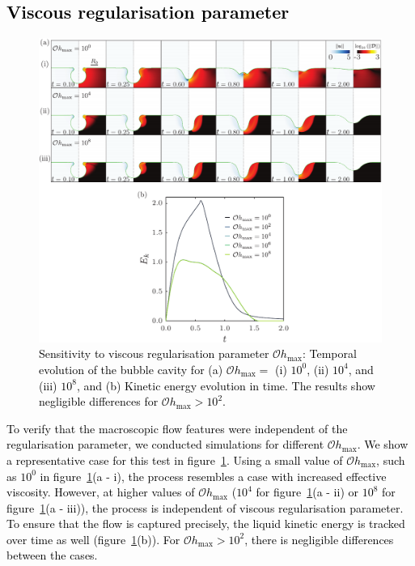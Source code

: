 \documentclass[final]{jfm}
\newcommand*\red{\textcolor{black}}
\begin{document}
\subsection{\red{Viscous regularisation parameter}}\label{App::OhMax}
\begin{figure}
	\centerline{\includegraphics[width=\linewidth]{FigureE1-eps-converted-to.pdf}}%
	\caption{\red{Sensitivity to viscous regularisation parameter $\mathcal{O}h_{\text{max}}$: Temporal evolution of the bubble cavity for (a) $\mathcal{O}h_{\text{max}} =$ (i) $10^0$, (ii) $10^4$, and (iii) $10^8$, and (b) Kinetic energy evolution in time. The results show negligible differences for $\mathcal{O}h_{\text{max}} > 10^2$.}}
	\label{fig:OhMax}
\end{figure}
\red{To verify that the macroscopic flow features were independent of the regularisation parameter, we conducted simulations for different $\mathcal{O}h_\text{max}$. We show a representative case for this test in figure~\ref{fig:OhMax}. Using a small value of $\mathcal{O}h_\text{max}$, such as $10^0$ in figure~\ref{fig:OhMax}(a - i), the process resembles a case with increased effective viscosity. However, at higher values of $\mathcal{O}h_\text{max}$ ($10^4$ for figure~\ref{fig:OhMax}(a - ii) or $10^8$ for figure~\ref{fig:OhMax}(a - iii)), the process is independent of viscous regularisation parameter. To ensure that the flow is captured precisely, the liquid kinetic energy is tracked over time as well (figure~\ref{fig:OhMax}(b)). For $\mathcal{O}h_{\text{max}} > 10^2$, there is negligible differences between the cases. }
\end{document}
